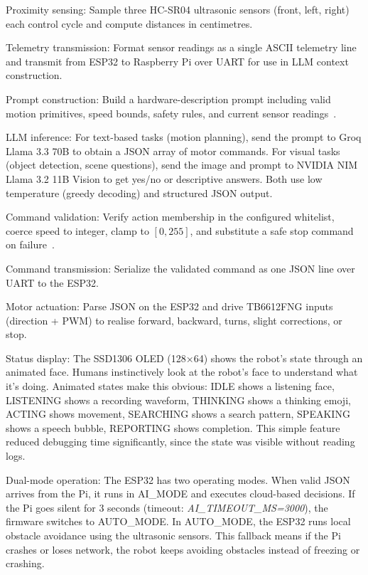 Proximity sensing: Sample three HC-SR04 ultrasonic sensors (front, left, right) each control cycle and compute distances in centimetres.

Telemetry transmission: Format sensor readings as a single ASCII telemetry line and transmit from ESP32 to Raspberry Pi over UART for use in LLM context construction.

Prompt construction: Build a hardware-description prompt including valid motion primitives, speed bounds, safety rules, and current sensor readings~\cite{ahn2022saycan}.

LLM inference: For text-based tasks (motion planning), send the prompt to Groq Llama 3.3 70B to obtain a JSON array of motor commands. For visual tasks (object detection, scene questions), send the image and prompt to NVIDIA NIM Llama 3.2 11B Vision to get yes/no or descriptive answers. Both use low temperature (greedy decoding) and structured JSON output.

Command validation: Verify action membership in the configured whitelist, coerce speed to integer, clamp to $[0,255]$, and substitute a safe stop command on failure~\cite{huang2023grounded}.

Command transmission: Serialize the validated command as one JSON line over UART to the ESP32.

Motor actuation: Parse JSON on the ESP32 and drive TB6612FNG inputs (direction + PWM) to realise forward, backward, turns, slight corrections, or stop.

Status display: The SSD1306 OLED (128×64) shows the robot's state through an animated face. Humans instinctively look at the robot's face to understand what it's doing. Animated states make this obvious: IDLE shows a listening face, LISTENING shows a recording waveform, THINKING shows a thinking emoji, ACTING shows movement, SEARCHING shows a search pattern, SPEAKING shows a speech bubble, REPORTING shows completion. This simple feature reduced debugging time significantly, since the state was visible without reading logs.

Dual-mode operation: The ESP32 has two operating modes. When valid JSON arrives from the Pi, it runs in AI\_MODE and executes cloud-based decisions. If the Pi goes silent for 3 seconds (timeout: \textit{AI\_TIMEOUT\_MS=3000}), the firmware switches to AUTO\_MODE. In AUTO\_MODE, the ESP32 runs local obstacle avoidance using the ultrasonic sensors. This fallback means if the Pi crashes or loses network, the robot keeps avoiding obstacles instead of freezing or crashing.

